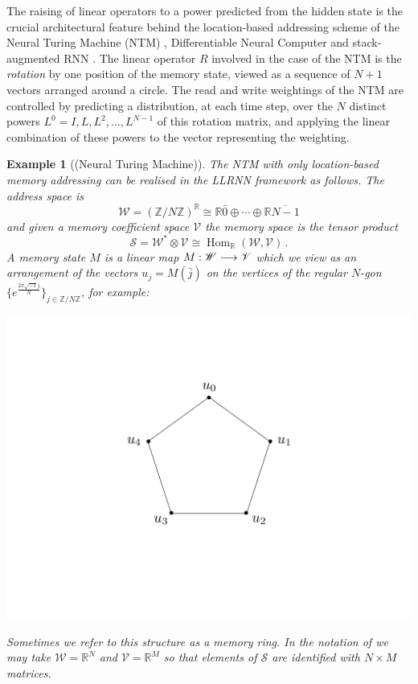 \documentclass[english,letter paper,12pt,leqno]{article}
\theoremstyle{example}
\newtheorem{example}[theorem]{Example}
\numberwithin{equation}{section}
\def\Hom{\operatorname{Hom}}
\begin{document}
The raising of linear operators to a power predicted from the hidden state is the crucial architectural feature behind the location-based addressing scheme of the Neural Turing Machine (NTM) \cite{ntm}, Differentiable Neural Computer \cite{dnc} and stack-augmented RNN \cite{joulin}. The linear operator $R$ involved in the case of the NTM is the \emph{rotation} by one position of the memory state, viewed as a sequence of $N+1$ vectors arranged around a circle. The read and write weightings of the NTM are controlled by predicting a distribution, at each time step, over the $N$ distinct powers $L^0 = I, L, L^2, \ldots, L^{N-1}$ of this rotation matrix, and applying the linear combination of these powers to the vector representing the weighting.

\begin{example}[(Neural Turing Machine)] The NTM with only location-based memory addressing can be realised in the LLRNN framework as follows. The \emph{address space} is
\[
\mathscr{W} = (\mathbb{Z}/N\mathbb{Z})^{\mathbb{R}} \cong \mathbb{R} \bar{0} \oplus \cdots \oplus \mathbb{R} \overline{N-1}
\]
and given a \emph{memory coefficient space} $\mathscr{V}$ the \emph{memory space} is the tensor product
\[
\mathscr{S} = \mathscr{W}^* \otimes \mathscr{V} \cong \Hom_{\mathbb{R}}(\mathscr{W}, \mathscr{V})\,.
\]
A memory state $M$ is a linear map $M: \mathscr{W} \longrightarrow \mathscr{V}$ which we view as an arrangement of the vectors $u_j = M(\bar{j})$ on the vertices of the regular $N$-gon $\{ e^{\frac{2\pi \sqrt{-1} j}{N}} \}_{j \in \mathbb{Z}/N\mathbb{Z}}$, for example:
\begin{center}
\includegraphics[scale=0.3]{dia1}
\end{center}
Sometimes we refer to this structure as a \emph{memory ring}. In the notation of \cite{ntm} we may take $\mathscr{W} = \mathbb{R}^N$ and $\mathscr{V} = \mathbb{R}^M$ so that elements of $\mathscr{S}$ are identified with $N \times M$ matrices. 


\end{example}
\end{document}
